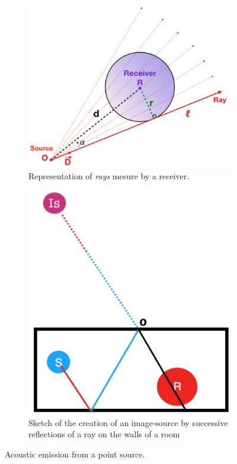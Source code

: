 \documentclass[AMA,STIX1COL]{WileyNJD-v2}
\begin{document}
%
\begin{figure}[b]
	\centering
	\begin{subfigure}{0.5\textwidth}
		\includegraphics[width=\textwidth]{rays}
		\caption{Representation of \textit{rays} mesure by a receiver. }
		\label{rays}
	\end{subfigure}	
	\qquad
		\begin{subfigure}{0.4\textwidth}
	\includegraphics[width=\linewidth]{schema_SI}
	\caption{Sketch of the creation of an image-source by successive reflections of a ray on the walls of a room}
	\label{schema_SI}
	\end{subfigure}
	\caption{Acoustic emission from a point source.}
\end{figure}
\end{document}

